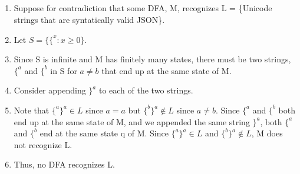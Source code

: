 \documentclass[11pt]{article}
\begin{document}
\subsection{} %
\begin{enumerate}
	\item Suppose for contradiction that some DFA, M, recognizes L = \{Unicode strings that are syntatically valid JSON\}.
	\item Let $S=\{\{^x:x\geq 0\}$.
	\item Since S is infinite and M has finitely many states, there must be two strings, $\{^a$ and $\{^b$ in S for $a \neq b$ that end up at the same state of M. 
	\item Consider appending $\}^a$ to each of the two strings. 
	\item Note that $\{^a\}^a \in L$ since $a=a$ but $\{^b\}^a \notin L$ since $a\neq b$. Since $\{^a$ and $\{^b$ both end up at the same state of M, and we appended the same string $\}^a$, both $\{^a$ and $\{^b$ end at the same state q of M. Since $\{^a\}^a \in L$ and $\{^b\}^a \notin L$, M does not recognize L. 
	\item Thus, no DFA recognizes L. 
\end{enumerate}
\end{document}

